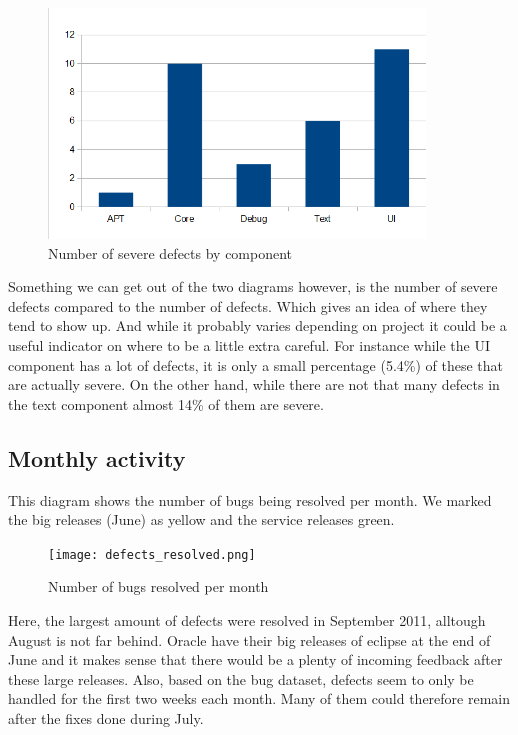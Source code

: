 \documentclass{article}
\begin{document}
\begin{figure}[H]
\center
\includegraphics[width=100mm]{severe_defects_per_component.png}
\caption{Number of severe defects by component}
\end{figure}

Something we can get out of the two diagrams however, is the number of severe defects compared to the number of defects.
Which gives an idea of where they tend to show up.
And while it probably varies depending on project it could be a useful indicator on where to be a little extra careful.
For instance while the UI component has a lot of defects, it is only a small percentage (5.4\%) of these that are actually severe.
On the other hand, while there are not that many defects in the text component almost 14\% of them are severe.

\subsection{Monthly activity}
This diagram shows the number of bugs being resolved per month.
We marked the big releases (June) as yellow and the service releases green.
\begin{figure}[H]
\center
\texttt{[image: defects\_resolved.png]}
\caption{Number of bugs resolved per month}
\end{figure}
Here, the largest amount of defects were resolved in September 2011, alltough August is not far behind. 
Oracle have their big releases of eclipse at the end of June and it makes sense that there would be a plenty of incoming feedback after these large releases.
Also, based on the bug dataset, defects seem to only be handled for the first two weeks each month.
Many of them could therefore remain after the fixes done during July.
\end{document}
